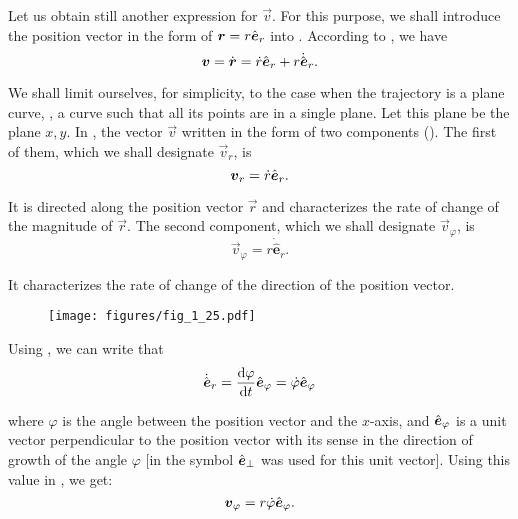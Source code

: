 Let us obtain still another expression for $\vec{v}$. For this purpose, we shall introduce the position vector in the form of $\boldsymbol{r}=r\hat{\boldsymbol{e}}_{r}$ into . According to , we have
\begin{equation}\label{eq:1_68}
\boldsymbol{v} = \dot{\boldsymbol{r}} = \dot{r}\hat{\boldsymbol{e}}_{r} + r\dot{\hat{\boldsymbol{e}}}_r.
\end{equation}

\noindent
We shall limit ourselves, for simplicity, to the case when the trajectory is a plane curve, \ie, a curve such that all its points are in a single plane. Let this plane be the plane $x, y$. In , the vector $\vec{v}$ written in the form of two components (). The first of them, which we shall designate $\vec{v}_r$, is
\begin{equation}\label{eq:1_69}
\boldsymbol{v}_r = \dot{r}\hat{\boldsymbol{e}}_{r}.
\end{equation}

\noindent
It is directed along the position vector $\vec{r}$ and characterizes the rate of change of the magnitude of $\vec{r}$. The second component, which we shall designate $\vec{v}_{\varphi}$, is
\begin{equation}\label{eq:1_70}
\vec{v}_{\varphi} = r\dot{\hat{\boldsymbol{e}}}_r.
\end{equation}

\noindent
It characterizes the rate of change of the direction of the position vector. 

\begin{figure}[t]
	\begin{center}
		\texttt{[image: figures/fig\_1\_25.pdf]}
		\caption[]{}
		\label{fig:1_25}
	\end{center}
	\vspace{-0.7cm}
\end{figure}

Using , we can write that
\begin{equation*}
\dot{\hat{\boldsymbol{e}}}_r = \frac{\mathrm{d}\varphi}{\mathrm{d} t}\hat{\boldsymbol{e}}_{\varphi} = \dot{\varphi}\hat{\boldsymbol{e}}_{\varphi}
\end{equation*}

\noindent
where $\varphi$ is the angle between the position vector and the $x$-axis, and $\hat{\boldsymbol{e}}_{\varphi}$ is a unit vector perpendicular to the position vector with its sense in the direction of growth of the angle $\varphi$ [in  the symbol $\hat{\boldsymbol{e}}_{\perp}$ was used for this unit vector]. Using this value in , we get:
\begin{equation}\label{eq:1_71}
\boldsymbol{v}_{\varphi} = r\dot{\varphi}\hat{\boldsymbol{e}}_{\varphi}.
\end{equation}

